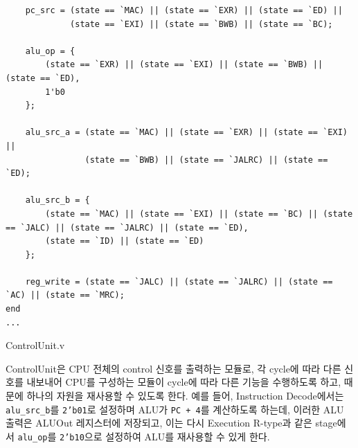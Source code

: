 \documentclass[openright, a4paper]{article}
\newenvironment{longlisting}{\captionsetup{type=listing}}{}
\newcommand{\code}[1]{\texttt{#1}}
\begin{document}
\begin{longlisting}
\begin{verbatim}
    pc_src = (state == `MAC) || (state == `EXR) || (state == `ED) ||
             (state == `EXI) || (state == `BWB) || (state == `BC);

    alu_op = {
        (state == `EXR) || (state == `EXI) || (state == `BWB) || (state == `ED),
        1'b0
    };

    alu_src_a = (state == `MAC) || (state == `EXR) || (state == `EXI) ||
                (state == `BWB) || (state == `JALRC) || (state == `ED);

    alu_src_b = {
        (state == `MAC) || (state == `EXI) || (state == `BC) || (state == `JALC) || (state == `JALRC) || (state == `ED),
        (state == `ID) || (state == `ED)
    };

    reg_write = (state == `JALC) || (state == `JALRC) || (state == `AC) || (state == `MRC);
end
...
    \end{verbatim}
    \caption{ControlUnit.v}
\end{longlisting}
\break

ControlUnit은 CPU 전체의 control 신호를 출력하는 모듈로, 각 cycle에 따라 다른
신호를 내보내어 CPU를 구성하는 모듈이 cycle에 따라 다른 기능을 수행하도록 하고, 
때문에 하나의 자원을 재사용할 수 있도록 한다. 예를 들어, Instruction 
Decode에서는 \code{alu_src_b}를 \code{2'b01}로 설정하며 ALU가 \code{PC + 4}를
계산하도록 하는데, 이러한 ALU 출력은 ALUOut 레지스터에 저장되고, 이는 다시
Execution R-type과 같은 stage에서 \code{alu_op}를 \code{2'b10}으로 설정하여
ALU를 재사용할 수 있게 한다.
\end{document}
